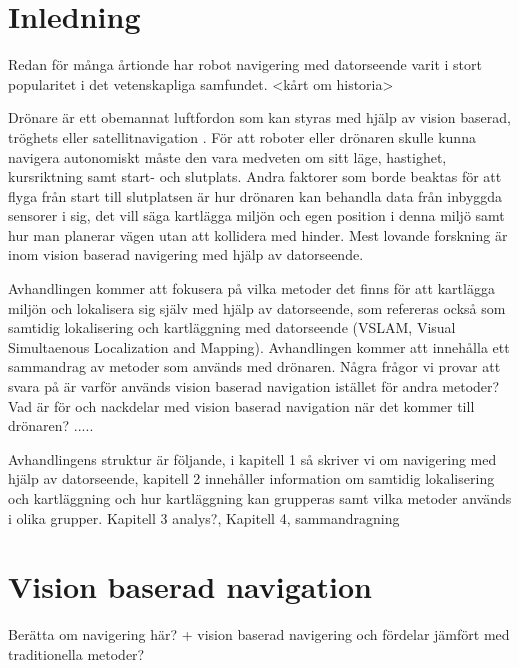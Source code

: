 
\chapter{Inledning}

Redan för många årtionde har robot navigering med datorseende varit i stort popularitet i det vetenskapliga samfundet. <kårt om historia>

Drönare är ett obemannat luftfordon som kan styras med hjälp av vision baserad, tröghets eller satellitnavigation \citep{geospatial}. För att roboter eller drönaren skulle kunna navigera autonomiskt måste den vara medveten om sitt läge, hastighet, kursriktning samt start- och slutplats. Andra faktorer som borde beaktas för att flyga från start till slutplatsen är hur drönaren kan behandla data från inbyggda sensorer i sig, det vill säga kartlägga miljön och egen position i denna miljö samt hur man planerar vägen utan att kollidera med hinder. Mest lovande forskning är inom vision baserad navigering med hjälp av datorseende.

Avhandlingen kommer att fokusera på vilka metoder det finns för att kartlägga miljön och lokalisera sig själv med hjälp av datorseende, som refereras också som samtidig lokalisering och kartläggning med datorseende (VSLAM, Visual Simultaenous Localization and Mapping). Avhandlingen kommer att innehålla ett sammandrag av metoder som används med drönaren. Några frågor vi provar att svara på är varför används vision baserad navigation istället för andra metoder? Vad är för och nackdelar med vision baserad navigation när det kommer till drönaren? .....

Avhandlingens struktur är följande, i kapitell 1 så skriver vi om navigering med hjälp av datorseende, kapitell 2 innehåller information om samtidig lokalisering och kartläggning och hur kartläggning kan grupperas samt vilka metoder används i olika grupper. Kapitell 3 analys?, Kapitell 4, sammandragning

\chapter{Vision baserad navigation}

Berätta om navigering här? + vision baserad navigering och fördelar jämfört med traditionella metoder?

